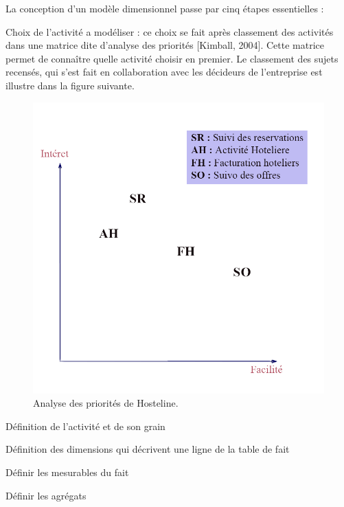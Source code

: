  La conception d’un modèle dimensionnel passe par cinq étapes essentielles :
 \begin{list}{•}{ }
    \item Choix de l’activité a modéliser : ce choix se fait après classement des activités dans une matrice dite d’analyse des priorités [Kimball, 2004]. Cette matrice permet de connaître quelle activité choisir en premier. Le classement des sujets recensés, qui s’est fait en collaboration avec les décideurs de l’entreprise est illustre dans la figure suivante.
    \begin{figure}[!htbp]
	\begin{center}
		\includegraphics[scale=0.35]{images/priority.png}
		\caption{Analyse des priorités de Hosteline.}
		\label{use_bi_tools}
	\end{center}
	\end{figure}
    \item Définition de l’activité et de son grain
	\item Définition des dimensions qui décrivent une ligne de la table de fait
	\item Définir les mesurables du fait
    \item Définir les agrégats 
    
 \end{list}
 
